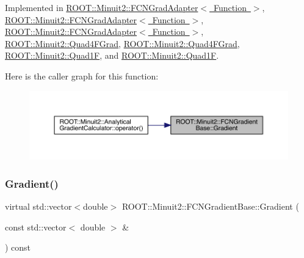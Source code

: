 Implemented in \mbox{\hyperlink{classROOT_1_1Minuit2_1_1FCNGradAdapter_ae91d0453fd5e953f75551576659d6c7b}{R\+O\+O\+T\+::\+Minuit2\+::\+F\+C\+N\+Grad\+Adapter$<$ Function $>$}}, \mbox{\hyperlink{classROOT_1_1Minuit2_1_1FCNGradAdapter_ae91d0453fd5e953f75551576659d6c7b}{R\+O\+O\+T\+::\+Minuit2\+::\+F\+C\+N\+Grad\+Adapter$<$ Function $>$}}, \mbox{\hyperlink{classROOT_1_1Minuit2_1_1FCNGradAdapter_ae91d0453fd5e953f75551576659d6c7b}{R\+O\+O\+T\+::\+Minuit2\+::\+F\+C\+N\+Grad\+Adapter$<$ Function $>$}}, \mbox{\hyperlink{classROOT_1_1Minuit2_1_1Quad4FGrad_afd3b64a4236e31bdf9c330e33ac7ac89}{R\+O\+O\+T\+::\+Minuit2\+::\+Quad4\+F\+Grad}}, \mbox{\hyperlink{classROOT_1_1Minuit2_1_1Quad4FGrad_afd3b64a4236e31bdf9c330e33ac7ac89}{R\+O\+O\+T\+::\+Minuit2\+::\+Quad4\+F\+Grad}}, \mbox{\hyperlink{classROOT_1_1Minuit2_1_1Quad1F_a5862cb7b7c00f86bcff155d0033abd7f}{R\+O\+O\+T\+::\+Minuit2\+::\+Quad1F}}, and \mbox{\hyperlink{classROOT_1_1Minuit2_1_1Quad1F_a5862cb7b7c00f86bcff155d0033abd7f}{R\+O\+O\+T\+::\+Minuit2\+::\+Quad1F}}.

Here is the caller graph for this function\+:
\nopagebreak
\begin{figure}[H]
\begin{center}
\leavevmode
\includegraphics[width=350pt]{d2/d53/classROOT_1_1Minuit2_1_1FCNGradientBase_a004740e7e25a1358aafde6694196ef88_icgraph}
\end{center}
\end{figure}
\mbox{\label{classROOT_1_1Minuit2_1_1FCNGradientBase_a004740e7e25a1358aafde6694196ef88}} 
\subsubsection{\texorpdfstring{Gradient()}{Gradient()}\hspace{0.1cm}{\footnotesize\ttfamily [2/3]}}
{\footnotesize\ttfamily virtual std\+::vector$<$double$>$ R\+O\+O\+T\+::\+Minuit2\+::\+F\+C\+N\+Gradient\+Base\+::\+Gradient (\begin{DoxyParamCaption}\item[{const std\+::vector$<$ double $>$ \&}]{ }\end{DoxyParamCaption}) const\hspace{0.3cm}{\ttfamily [pure virtual]}}



